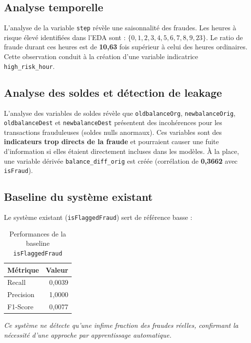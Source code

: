 \documentclass[12pt,a4paper,twoside]{report}
\begin{document}
\subsection{Analyse temporelle}

L'analyse de la variable \texttt{step} révèle une saisonnalité des fraudes. Les heures à risque élevé identifiées dans l'EDA sont : $\{0, 1, 2, 3, 4, 5, 6, 7, 8, 9, 23\}$. Le ratio de fraude durant ces heures est de \textbf{10,63} fois supérieur à celui des heures ordinaires. Cette observation conduit à la création d'une variable indicatrice \texttt{high\_risk\_hour}.

\subsection{Analyse des soldes et détection de leakage}

L'analyse des variables de soldes révèle que \texttt{oldbalanceOrg}, \texttt{newbalanceOrig}, \texttt{oldbalanceDest} et \texttt{newbalanceDest} présentent des incohérences pour les transactions frauduleuses (soldes nulls anormaux). Ces variables sont des \textbf{indicateurs trop directs de la fraude} et pourraient causer une fuite d'information si elles étaient directement incluses dans les modèles. À la place, une variable dérivée \texttt{balance\_diff\_orig} est créée (corrélation de \textbf{0,3662} avec \texttt{isFraud}).

\subsection{Baseline du système existant}

Le système existant (\texttt{isFlaggedFraud}) sert de référence basse :

\begin{table}[H]
\centering
\caption{Performances de la baseline \texttt{isFlaggedFraud}}
\label{tab:baseline_perf}
\begin{tabular}{lr}
\toprule
\textbf{Métrique} & \textbf{Valeur} \\
\midrule
Recall    & 0,0039 \\
Precision & 1,0000 \\
F1-Score  & 0,0077 \\
\bottomrule
\end{tabular}
\end{table}

\textit{Ce système ne détecte qu'une infime fraction des fraudes réelles, confirmant la nécessité d'une approche par apprentissage automatique.}
\end{document}
